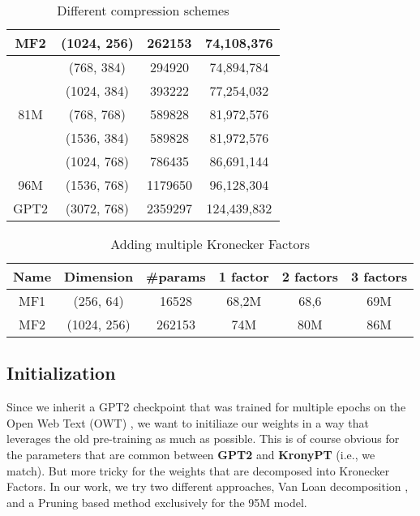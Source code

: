 \documentclass{article}
\begin{document}
{\begin{table}[htb!]
\begin{tabular}{|c|c|c|c|}
MF2		&  (1024, 256)      &   262153     & 74,108,376  \\ \hline 
		&  (768, 384)       &   294920     & 74,894,784  \\ \hline
		&  (1024, 384)      &   393222     & 77,254,032  \\ \hline
81M 	&  (768, 768)       &   589828     & 81,972,576  \\ \hline
		&  (1536, 384)      &   589828     & 81,972,576  \\ \hline
		&  (1024, 768)      &   786435     & 86,691,144  \\ \hline
96M		&  (1536, 768)      &   1179650    & 96,128,304  \\ \hline
GPT2	&  (3072, 768)      &   2359297    & 124,439,832 \\ \hline
\end{tabular}
\caption{Different compression schemes}
\end{table}


\begin{table}[htb!]
\centering
\begin{tabular}{|c|c|c|c|c|c|}
\hline
Name 	& Dimension 		& 	#params    & 1 factor    & 2 factors   & 3 factors     \\ \hline                                                                                 
MF1		&  (256, 64)        &   16528      & 68,2M       & 68,6  & 69M    \\ \hline
MF2		&  (1024, 256)      &   262153     & 74M         & 80M   & 86M    \\ \hline 
\end{tabular}
\caption{Adding multiple Kronecker Factors}
\end{table}


\newpage

\subsection{Initialization}%
\label{sub:Initialization}

Since we inherit a GPT2 checkpoint that was trained for multiple epochs on the Open Web Text (OWT) \cite{Gokaslan2019OpenWeb}, we want to initiliaze our weights in a way that leverages the old pre-training as much as possible. This is of course obvious for the parameters that are common between \textbf{GPT2} and \textbf{KronyPT} (i.e., we match).  But more tricky for the weights that are decomposed into Kronecker Factors. In our work, we try two different approaches, Van Loan decomposition \cite{van1993approximation}, and a Pruning based method exclusively for the 95M model.

}
\end{document}
